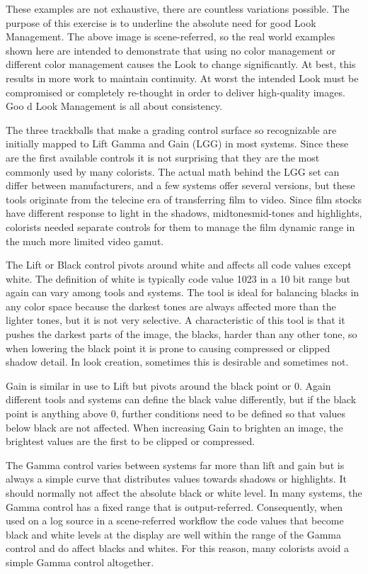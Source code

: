 These examples are not exhaustive, there are countless variations possible. The purpose of this exercise is to underline the absolute need for good Look Management. The above image is scene-referred, so the real world examples shown here are intended to demonstrate that using no color management or different color management causes the Look to change significantly. At best, this results in more work to maintain continuity. At worst the intended Look must be compromised or completely re-thought in order to deliver high-quality images. Goo d Look Management is all about consistency.

The three trackballs that make a grading control surface so recognizable are initially mapped to Lift Gamma and Gain (LGG) in most systems. Since these are the first available controls it is not surprising that they are the most commonly used by many colorists. The actual math behind the LGG set can differ between manufacturers, and a few systems offer several versions, but these tools originate from the telecine era of transferring film to video. Since film stocks have different response to light in the shadows, midtonesmid-tones and highlights, colorists needed separate controls for them to manage the film dynamic range in the much more limited video gamut.

The Lift or Black control pivots around white and affects all code values except white. The definition of white is typically code value 1023 in a 10 bit range but again can vary among tools and systems. The tool is ideal for balancing blacks in any color space because the darkest tones are always affected more than the lighter tones, but it is not very selective. A characteristic of this tool is that it pushes the darkest parts of the image, the blacks, harder than any other tone, so when lowering the black point it is prone to causing compressed or clipped shadow detail. In look creation, sometimes this is desirable and sometimes not.

Gain is similar in use to Lift but pivots around the black point or 0. Again different tools and systems can define the black value differently, but if the black point is anything above 0, further conditions need to be defined so that values below black are not affected. When increasing Gain to brighten an image, the brightest values are the first to be clipped or compressed. 

The Gamma control varies between systems far more than lift and gain but is always a simple curve that distributes values towards shadows or highlights. It should normally not affect the absolute black or white level. In many systems, the Gamma control has a fixed range that is output-referred. Consequently, when used on a log source in a scene-referred workflow the code values that become black and white levels at the display are well within the range of the Gamma control and do affect blacks and whites. For this reason, many colorists avoid a simple Gamma control altogether.



